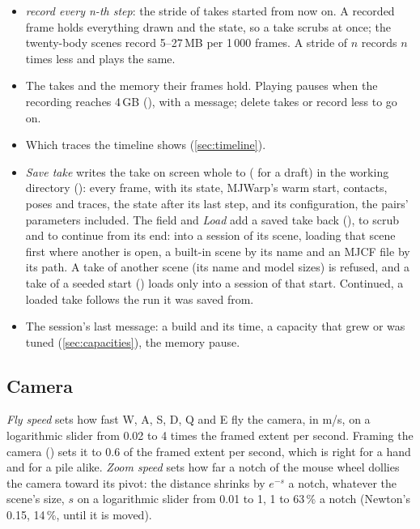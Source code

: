 \begin{itemize}
\item \emph{record every n-th step}: the stride of takes started from now on. A recorded frame holds everything drawn and the state, so a take scrubs at once; the twenty-body scenes record 5--27\,MB per 1\,000 frames. A stride of $n$ records $n$ times less and plays the same.
\item The takes and the memory their frames hold. Playing pauses when the recording reaches 4\,GB (), with a message; delete takes or record less to go on.
\item Which traces the timeline shows (\cref{sec:timeline}).
\item \emph{Save take} writes the take on screen whole to  ( for a draft) in the working directory (): every frame, with its state, MJWarp's warm start, contacts, poses and traces, the state after its last step, and its configuration, the pairs' parameters included. The field and \emph{Load} add a saved take back (), to scrub and to continue from its end: into a session of its scene, loading that scene first where another is open, a built-in scene by its name and an MJCF file by its path. A take of another scene (its name and model sizes) is refused, and a take of a seeded start () loads only into a session of that start. Continued, a loaded take follows the run it was saved from.
\item The session's last message: a build and its time, a capacity that grew or was tuned (\cref{sec:capacities}), the memory pause.
\end{itemize}

\subsection{Camera}\label{sec:camera}

\emph{Fly speed} sets how fast W, A, S, D, Q and E fly the camera, in m/s, on a logarithmic slider from 0.02 to 4 times the framed extent per second. Framing the camera () sets it to 0.6 of the framed extent per second, which is right for a hand and for a pile alike. \emph{Zoom speed} sets how far a notch of the mouse wheel dollies the camera toward its pivot: the distance shrinks by $e^{-s}$ a notch, whatever the scene's size, $s$ on a logarithmic slider from 0.01 to 1, 1 to 63\,\% a notch (Newton's 0.15, 14\,\%, until it is moved).

